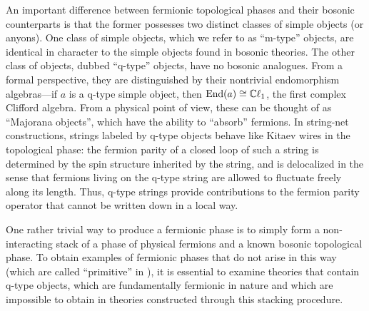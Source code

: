 
An important difference between fermionic topological phases and their bosonic counterparts is that 
the former possesses two distinct classes of simple objects (or anyons). 
One class of simple objects, which we refer to as ``m-type'' objects, are identical in character
to the simple objects found in bosonic theories. 
The other class of objects, dubbed ``q-type'' objects, have no bosonic analogues. 
From a formal perspective, they are distinguished by their nontrivial endomorphism algebras---if 
$a$ is a q-type simple object, then $\text{End}(a) \cong \mathbb{C}\ell_1$, the first complex Clifford algebra. 
From a physical point of view, these can be thought of as ``Majorana objects'', which have the ability 
to ``absorb'' fermions. 
In string-net constructions, strings labeled by q-type objects behave like Kitaev wires in the 
topological phase: the fermion parity of a closed loop of such a string is determined by 
the spin structure inherited by the string, and is delocalized in the sense that fermions living on the q-type string are allowed to fluctuate freely along its length.
Thus, q-type strings provide contributions to the fermion parity operator that cannot be written down 
in a local way. 

One rather trivial way to produce a fermionic phase is to simply form a non-interacting stack of a phase of physical fermions 
and a known bosonic topological phase. 
To obtain examples of fermionic phases that do not arise in this way (which are called ``primitive'' in \cite{Lan2016b}),
it is essential to examine theories that contain q-type objects, which are fundamentally fermionic in nature and which are impossible to obtain in theories constructed through this stacking procedure. 

